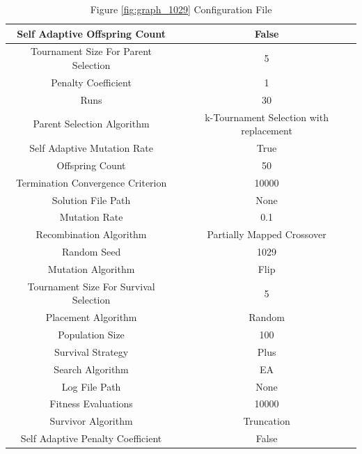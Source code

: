 \documentclass{standalone}
\begin{document}
\begin{table}[!htb]
	\centering
	\caption{Figure \ref{fig:graph_1029} Configuration File}
	\label{tab:graph_1029}
	\begin{tabular}{| c | c |}
		\hline
		Self Adaptive Offspring Count		& False		 \\
		\hline
		Tournament Size For Parent Selection		& 5		 \\
		\hline
		Penalty Coefficient		& 1		 \\
		\hline
		Runs		& 30		 \\
		\hline
		Parent Selection Algorithm		& k-Tournament Selection with replacement		 \\
		\hline
		Self Adaptive Mutation Rate		& True		 \\
		\hline
		Offspring Count		& 50		 \\
		\hline
		Termination Convergence Criterion		& 10000		 \\
		\hline
		Solution File Path		& None		 \\
		\hline
		Mutation Rate		& 0.1		 \\
		\hline
		Recombination Algorithm		& Partially Mapped Crossover		 \\
		\hline
		Random Seed		& 1029		 \\
		\hline
		Mutation Algorithm		& Flip		 \\
		\hline
		Tournament Size For Survival Selection		& 5		 \\
		\hline
		Placement Algorithm		& Random		 \\
		\hline
		Population Size		& 100		 \\
		\hline
		Survival Strategy		& Plus		 \\
		\hline
		Search Algorithm		& EA		 \\
		\hline
		Log File Path		& None		 \\
		\hline
		Fitness Evaluations		& 10000		 \\
		\hline
		Survivor Algorithm		& Truncation		 \\
		\hline
		Self Adaptive Penalty Coefficient		& False		 \\
		\hline
	\end{tabular}
\end{table}
\end{document}
